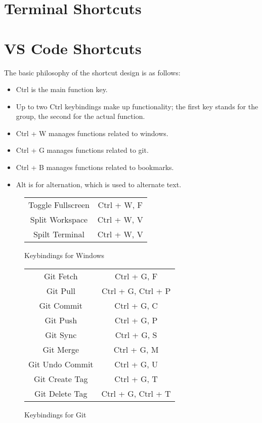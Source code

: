 \documentclass[10pt]{article}
\begin{document}
\section{Terminal Shortcuts} \label{S_Terminal}


\section{VS Code Shortcuts} \label{S_VSCode}
	The basic philosophy of the shortcut design is as follows:

	\begin{itemize}
		\item Ctrl is the main function key.
		\item Up to two Ctrl keybindings make up functionality; the first key stands for the group, the second for the actual function.
		\item Ctrl + W manages functions related to windows.
		\item Ctrl + G manages functions related to git.
		\item Ctrl + B manages functions related to bookmarks.
		\item Alt is for alternation, which is used to alternate text.
	\end{itemize}

	\begin{figure}[H]
		\centering
		\begin{tabular}{@{}c c@{}}
			\midrule

			Toggle Fullscreen & Ctrl + W, F \\
			Split Workspace & Ctrl + W, V \\
			Spilt Terminal & Ctrl + W, V \\

			\bottomrule
		\end{tabular}
		\caption{Keybindings for Windows}
	\end{figure}

	\begin{figure}[H]
		\centering
		\begin{tabular}{@{}c c@{}}
			\midrule

			Git Fetch & Ctrl + G, F \\
			Git Pull & Ctrl + G, Ctrl + P \\
			Git Commit & Ctrl + G, C \\
			Git Push & Ctrl + G, P \\
			Git Sync & Ctrl + G, S \\
			Git Merge & Ctrl + G, M \\
			Git Undo Commit & Ctrl + G, U \\
			Git Create Tag & Ctrl + G, T \\
			Git Delete Tag & Ctrl + G, Ctrl + T \\

			\bottomrule
		\end{tabular}
		\caption{Keybindings for Git}
	\end{figure}
\end{document}
